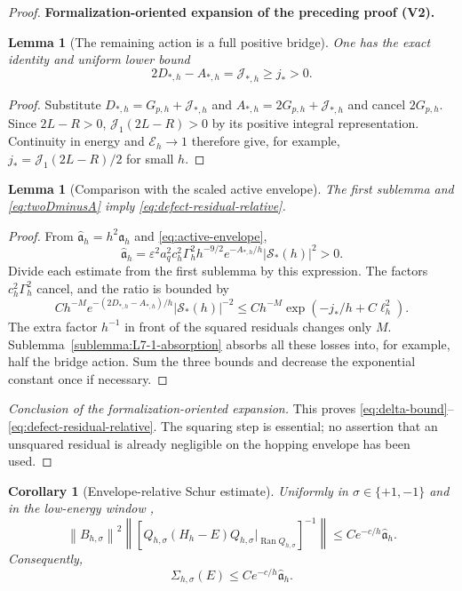 \documentclass[11pt]{article}
\newtheorem{lemma}[theorem]{Lemma}
\newtheorem{corollary}[theorem]{Corollary}
\newcommand{\formalisationparentid}{X}
\newenvironment{formalisationaddition}[1]{\par\medskip\begingroup\color{blue}\def\formalisationparentid{#1}\setcounter{formalizationsublemma}{0}\let\lemma\formalizationsublemma\let\endlemma\endformalizationsublemma
  \def\Eo{\mathcal E_h^\circ}\def\EE{\mathcal E_h}\def\phio{\phi_h^\circ}\def\phih{\phi_h}\def\Ho{H_h^{\rm atom}(v^\circ)}\def\Ha{H_h^{\rm atom}}\def\HL{H_h^{L}}\def\Dh{D_h}\def\Log{\operatorname{Log}}\def\ellh{\ell_h}\def\Gp{G_{p,h}}\def\Ast{A_{*,h}}\def\ahat{\widehat{\mathfrak a}_h}\def\ah{\mathfrak a_h}\def\rh{\widehat\rho_h}\def\deltah{\widehat\delta_h}\def\oldref##1{\textup{(##1)}}\def\interface##1{\par\noindent\textit{Analytical interface used here.} ##1\par}\def\finish{\par\noindent\textit{Conclusion of the formalization-oriented expansion.} }\par\noindent\textbf{Formalization-oriented expansion of the preceding proof (V2).}\par\smallskip
}{\par\endgroup\medskip
}
\newcommand{\eps}{\varepsilon}
\newcommand{\cJ}{\mathcal J}
\newcommand{\norm}[1]{\left\|#1\right\|}
\newcommand{\Ran}{\operatorname{Ran}}
\begin{document}
\begin{proof}
\begin{formalisationaddition}{T8.3}
\begin{lemma}[The remaining action is a full positive bridge]\label{sublemma:T8-3-action-difference}
One has the exact identity and uniform lower bound
\begin{equation*}
 2D_{*,h}-\Ast=\cJ_{*,h}\ge j_*>0.
\end{equation*}
\end{lemma}
\begin{proof}
Substitute $D_{*,h}=\Gp+\cJ_{*,h}$ and $\Ast=2\Gp+\cJ_{*,h}$ and cancel $2\Gp$. Since $2L-R>0$, $\cJ_1(2L-R)>0$ by its positive integral representation. Continuity in energy and $\EE\to1$ therefore give, for example, $j_*=\cJ_1(2L-R)/2$ for small $h$.
\end{proof}

\begin{lemma}[Comparison with the scaled active envelope]\label{sublemma:T8-3-envelope}
The first sublemma and \eqref{eq:twoDminusA} imply \eqref{eq:defect-residual-relative}.
\end{lemma}
\begin{proof}
From $\ahat=h^2\ah$ and \eqref{eq:active-envelope},
\[
 \ahat=\eps^2a_q^2c_h^2\Gamma_h^2h^{-9/2}
                 e^{-\Ast/h}|\mathcal S_*(h)|^2>0.
\]
Divide each estimate from the first sublemma by this expression. The factors $c_h^2\Gamma_h^2$ cancel, and the ratio is bounded by
\[
 Ch^{-M}e^{-(2D_{*,h}-\Ast)/h}|\mathcal S_*(h)|^{-2}
 \le Ch^{-M}\exp(-j_*/h+C\ellh^2).
\]
The extra factor $h^{-1}$ in front of the squared residuals changes only $M$. Sublemma~\ref{sublemma:L7-1-absorption} absorbs all these losses into, for example, half the bridge action. Sum the three bounds and decrease the exponential constant once if necessary.
\end{proof}
\finish This proves \eqref{eq:delta-bound}--\eqref{eq:defect-residual-relative}. The squaring step is essential; no assertion that an unsquared residual is already negligible on the hopping envelope has been used.
\end{formalisationaddition}

\end{proof}

\begin{corollary}[Envelope-relative Schur estimate]
\label{cor:envelope-schur-certificate}
Uniformly in $\sigma\in\{+1,-1\}$ and in the low-energy window
,
\begin{equation}\label{eq:envelope-schur-certificate}
 \norm{B_{h,\sigma}}^2
 \left\|
 \left[Q_{h,\sigma}(H_h-E)Q_{h,\sigma}
 \big|_{\Ran Q_{h,\sigma}}\right]^{-1}
 \right\|
 \le Ce^{-c/h}\widehat{\mathfrak a}_h.
\end{equation}
Consequently,
\begin{equation}\label{eq:Sigma-envelope-late}
 \Sigma_{h,\sigma}(E)
 \le Ce^{-c/h}\widehat{\mathfrak a}_h.
\end{equation}
\end{corollary}
\end{document}
